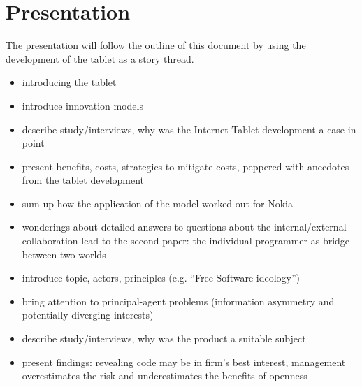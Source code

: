 \documentclass[a4paper]{scrartcl}
\begin{document}
\section{Presentation}

The presentation will follow the outline of this document by using the development of the tablet as a story thread.

\begin{itemize}
\item introducing the tablet
\item introduce innovation models
\item describe study/interviews, why was the Internet Tablet development a case in point
\item present benefits, costs, strategies to mitigate costs, peppered with anecdotes from the tablet development
\item sum up how the application of the model worked out for Nokia
\item wonderings about detailed answers to questions about the internal/external collaboration lead to the second paper: the individual programmer as bridge between two worlds
\item introduce topic, actors, principles (e.g. ``Free Software ideology'')
\item bring attention to principal-agent problems (information asymmetry and potentially diverging interests)
\item describe study/interviews, why was the product a suitable subject
\item present findings: revealing code may be in firm's best interest, management overestimates the risk and underestimates the benefits of openness
\end{itemize}


\printbibliography[keyword=innovation]
\end{document}
